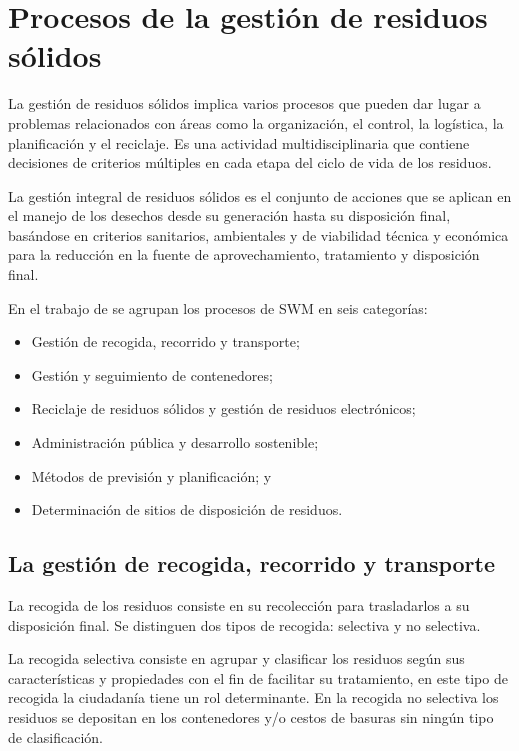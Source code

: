 \section{Procesos de la gestión de residuos sólidos}

La gestión de residuos sólidos implica varios procesos que pueden dar lugar a problemas relacionados con áreas como la organización, el control, la logística, la planificación y el reciclaje. Es una actividad multidisciplinaria que contiene decisiones de criterios múltiples en cada etapa del ciclo de vida de los residuos. 

La gestión integral de residuos sólidos es el conjunto de acciones que se aplican en el manejo de los desechos desde su generación hasta su disposición final, basándose en criterios sanitarios, ambientales y de viabilidad técnica y económica para la reducción en la fuente de aprovechamiento, tratamiento y disposición final.


En el trabajo de \citet{VitorinodeSouzaMelare2017TechnologiesReview} se agrupan los procesos de SWM en seis categorías:
\begin{itemize}
\item Gestión de recogida, recorrido y transporte; 
\item Gestión y seguimiento de contenedores; 
\item Reciclaje de residuos sólidos y gestión de residuos electrónicos;
\item Administración pública y desarrollo sostenible; 
\item Métodos de previsión y planificación; y 
\item Determinación de sitios de disposición de residuos.
\end{itemize}

\subsection{La gestión de recogida, recorrido y transporte}
La recogida de los residuos consiste en su recolección para trasladarlos a su disposición final. Se distinguen dos tipos de recogida: selectiva y no selectiva.

La recogida selectiva consiste en agrupar y clasificar los residuos según sus características y propiedades con el fin de facilitar su tratamiento, en este tipo de recogida la ciudadanía tiene un rol determinante. En la recogida no selectiva los residuos se depositan en los contenedores y/o cestos de basuras sin ningún tipo de clasificación.


